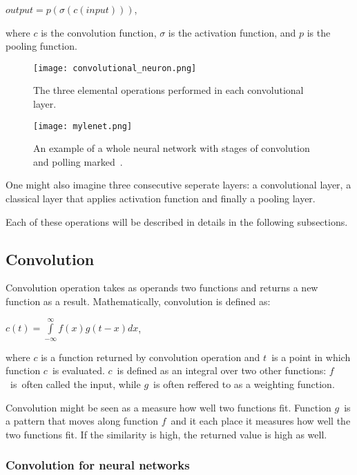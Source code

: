 \documentclass[a4paper,10pt]{report}
\begin{document}
	\begin{center}
	$output = p(\sigma(c(input)))$, 
	\end{center}
	
	
	where $c$ is the convolution function, $\sigma$ is the activation function, and $p$ is the pooling function. 
	
	\begin{figure}[h!]
	  \centering
	  \texttt{[image: convolutional\_neuron.png]}
	  \caption{The three elemental operations performed in each convolutional layer.}
	  \label{fig:con_neur}
	\end{figure} 
	
	\begin{figure}[h!]
	  \centering
	  \texttt{[image: mylenet.png]}
	  \caption{An example of a whole neural network with stages of convolution and polling marked~\cite{con_neur_INT}.}
	  \label{fig:con_neur_PIC}
	\end{figure} 
	One might also imagine three consecutive seperate layers: a convolutional layer, a classical layer that applies activation function and finally a pooling layer. 
	
	Each of these operations will be described in details in the following subsections. 
	
	\subsection{Convolution}\label{sec:convolution}
	Convolution operation takes as operands two functions and returns a new function as a result. Mathematically, convolution is defined as:  
	\begin{center}
	$c(t) = \int\limits_{-\infty}^\infty f(x)g(t-x)dx$, 
	\end{center}
	
	where $c$ is a function returned by convolution operation and $t$~is a point in which function $c$~is evaluated. $c$~is defined as an integral over two other functions: $f$~is~often called the input, while $g$~is often reffered to as a weighting function. 
	
	Convolution might be seen as a measure how well two functions fit. Function $g$~is a pattern that moves along function $f$~and it each place it measures how well the two functions fit. If the similarity is high, the returned value is high as well. 
		
	\subsubsection{Convolution for neural networks}
	  
\end{document}
